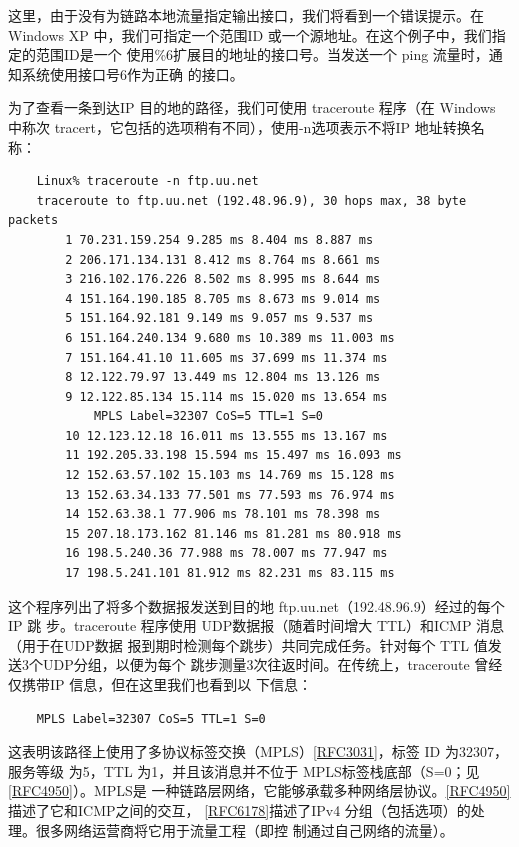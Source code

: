 这里，由于没有为链路本地流量指定输出接口，我们将看到一个错误提示。在 Windows
XP 中，我们可指定一个范围ID 或一个源地址。在这个例子中，我们指定的范围ID是一个
使用\%6扩展目的地址的接口号。当发送一个 ping 流量时，通知系统使用接口号6作为正确
的接口。

为了查看一条到达IP 目的地的路径，我们可使用 traceroute 程序（在 Windows 中称次
tracert，它包括的选项稍有不同），使用-n选项表示不将IP 地址转换名称：

\begin{verbatim}
    Linux% traceroute -n ftp.uu.net
    traceroute to ftp.uu.net (192.48.96.9), 30 hops max, 38 byte packets
        1 70.231.159.254 9.285 ms 8.404 ms 8.887 ms
        2 206.171.134.131 8.412 ms 8.764 ms 8.661 ms
        3 216.102.176.226 8.502 ms 8.995 ms 8.644 ms
        4 151.164.190.185 8.705 ms 8.673 ms 9.014 ms
        5 151.164.92.181 9.149 ms 9.057 ms 9.537 ms
        6 151.164.240.134 9.680 ms 10.389 ms 11.003 ms
        7 151.164.41.10 11.605 ms 37.699 ms 11.374 ms
        8 12.122.79.97 13.449 ms 12.804 ms 13.126 ms
        9 12.122.85.134 15.114 ms 15.020 ms 13.654 ms
            MPLS Label=32307 CoS=5 TTL=1 S=0
        10 12.123.12.18 16.011 ms 13.555 ms 13.167 ms
        11 192.205.33.198 15.594 ms 15.497 ms 16.093 ms
        12 152.63.57.102 15.103 ms 14.769 ms 15.128 ms
        13 152.63.34.133 77.501 ms 77.593 ms 76.974 ms
        14 152.63.38.1 77.906 ms 78.101 ms 78.398 ms
        15 207.18.173.162 81.146 ms 81.281 ms 80.918 ms
        16 198.5.240.36 77.988 ms 78.007 ms 77.947 ms
        17 198.5.241.101 81.912 ms 82.231 ms 83.115 ms
\end{verbatim}

这个程序列出了将多个数据报发送到目的地 ftp.uu.net（192.48.96.9）经过的每个IP 跳
步。traceroute 程序使用 UDP数据报（随着时间增大 TTL）和ICMP 消息（用于在UDP数据
报到期时检测每个跳步）共同完成任务。针对每个 TTL 值发送3个UDP分组，以便为每个
跳步测量3次往返时间。在传统上，traceroute 曾经仅携带IP 信息，但在这里我们也看到以
下信息：

\begin{verbatim}
    MPLS Label=32307 CoS=5 TTL=1 S=0
\end{verbatim}

这表明该路径上使用了多协议标签交换（MPLS）\href{https://www.rfc-editor.org/rfc/rfc3031}{[RFC3031]}，标签 ID 为32307，服务等级
为5，TTL 为1，并且该消息并不位于 MPLS标签栈底部（S=0；见\href{https://www.rfc-editor.org/rfc/rfc4950}{[RFC4950]}）。MPLS是
一种链路层网络，它能够承载多种网络层协议。\href{https://www.rfc-editor.org/rfc/rfc4950}{[RFC4950]}描述了它和ICMP之间的交互，
\href{https://www.rfc-editor.org/rfc/rfc6178}{[RFC6178]}描述了IPv4 分组（包括选项）的处理。很多网络运营商将它用于流量工程（即控
制通过自己网络的流量）。

